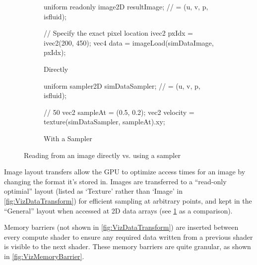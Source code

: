 \begin{figure}[ht]
    \centering
     \begin{subfigure}[b]{0.49\textwidth}
         \centering
\begin{glslcode}
uniform readonly image2D resultImage;
 // = (u, v, p, isfluid);

// Specify the exact pixel location
ivec2 pxIdx = ivec2(200, 450);
vec4 data = imageLoad(simDataImage, pxIdx);
\end{glslcode}
\caption{Directly}
     \end{subfigure}
     \hfill
     \begin{subfigure}[b]{0.49\textwidth}
         \centering
\begin{glslcode}
uniform sampler2D simDataSampler;
 // = (u, v, p, isfluid);
 
// 50%
vec2 sampleAt = (0.5, 0.2);
vec2 velocity = texture(simDataSampler, sampleAt).xy;
\end{glslcode}
\caption{With a Sampler}
     \end{subfigure}
  \caption{Reading from an image directly vs. using a sampler}
    \label{fig:VizImageRead}
\end{figure}

Image layout transfers allow the GPU to optimize access times for an image by changing the format it's stored in.
Images are transferred to a ``read-only optimial'' layout (listed as `Texture' rather than `Image' in \cref{fig:VizDataTransform}) for efficient sampling at arbitrary points, and kept in the ``General'' layout when accessed at 2D data arrays (see \cref{fig:VizImageRead} as a comparison).

Memory barriers (not shown in \cref{fig:VizDataTransform}) are inserted between every compute shader to ensure any required data written from a previous shader is visible to the next shader\cite{TheKhronosGroupVulkanSpec}. %
These memory barriers are quite granular, as shown in \cref{fig:VizMemoryBarrier}.

